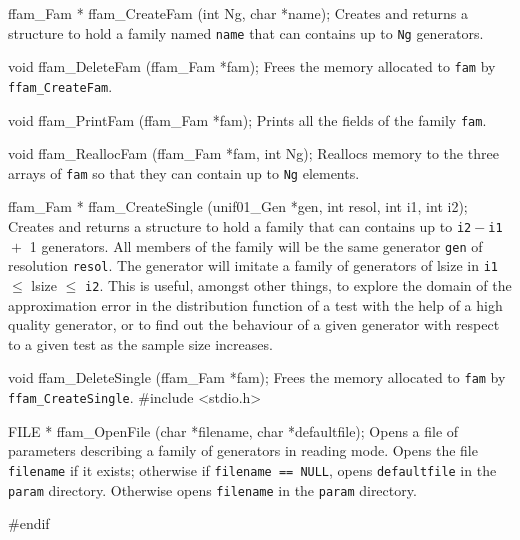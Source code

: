 ffam_Fam * ffam_CreateFam (int Ng, char *name);
\endcode
 \tab 
  Creates and returns a structure to hold a family named 
  {\tt name} that can contains up to {\tt Ng} generators. 
 \endtab
\code


void ffam_DeleteFam (ffam_Fam *fam);
\endcode
 \tab 
  Frees the memory allocated to {\tt fam} by {\tt ffam\_CreateFam}.
 \endtab
\code


void ffam_PrintFam (ffam_Fam *fam);
\endcode
 \tab 
  Prints all the fields of the family {\tt fam}.
 \endtab
\code


void ffam_ReallocFam (ffam_Fam *fam, int Ng);
\endcode
 \tab 
  Reallocs memory to the three arrays of {\tt fam} so that they can contain
  up to  {\tt Ng} elements.
 \endtab
\code


ffam_Fam * ffam_CreateSingle (unif01_Gen *gen, int resol, int i1, int i2);
\endcode
 \tab 
  Creates and returns a structure to hold a family that can contains up
  to {\tt i2}${} - {}${\tt i1} ${} + {}$ 1 generators. All members of
  the family will be the same generator {\tt gen} of resolution {\tt resol}.
  The generator will imitate a family of generators of lsize in
  {\tt i1} $ \le $ lsize $\le$ {\tt i2}.
  This is useful, amongst other things, to explore the domain of
  the approximation error in the distribution function of a test with the
  help of a high quality generator, or to find out the behaviour of a
  given generator with respect to a given test as the
  sample size increases.
 \endtab
\code


void ffam_DeleteSingle (ffam_Fam *fam);
\endcode
 \tab 
  Frees the memory allocated to {\tt fam} by {\tt ffam\_CreateSingle}.
 \endtab
\code
\hide
#include <stdio.h>

FILE * ffam_OpenFile (char *filename, char *defaultfile);
\endcode
 \tab 
  Opens a file of parameters describing a family of generators in reading
  mode. Opens the file {\tt filename} if it exists; otherwise if
  {\tt filename == NULL}, opens {\tt defaultfile} in the {\tt param}
  directory.  Otherwise opens {\tt filename} in the  {\tt param}
  directory.
 \endtab
\code

#endif
\endhide
\endcode
